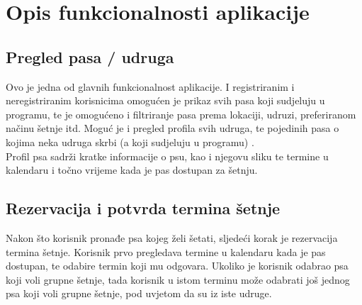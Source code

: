         \section{Opis funkcionalnosti aplikacije}
        \subsection{Pregled pasa / udruga}
        
            Ovo je jedna od glavnih funkcionalnost aplikacije. I registriranim i neregistriranim korisnicima omogućen je prikaz svih pasa koji sudjeluju u programu, te je omogućeno i filtriranje pasa prema lokaciji, udruzi, preferiranom načinu šetnje itd. Moguć je i pregled profila svih udruga, te pojedinih pasa o kojima neka udruga skrbi (a koji sudjeluju u programu) . \\
            
            \noindent Profil psa sadrži kratke informacije o psu, kao i njegovu sliku te termine u kalendaru i točno vrijeme kada je pas dostupan za šetnju. 
        
        \subsection{Rezervacija i potvrda termina šetnje}
        
            Nakon što korisnik pronađe psa kojeg želi šetati, sljedeći korak je rezervacija termina šetnje. Korisnik prvo pregledava termine u kalendaru kada je pas dostupan, te odabire termin koji mu odgovara. Ukoliko je korisnik odabrao psa koji voli grupne šetnje, tada korisnik u istom terminu može odabrati još jednog psa koji voli grupne šetnje, pod uvjetom da su iz iste udruge.

            
